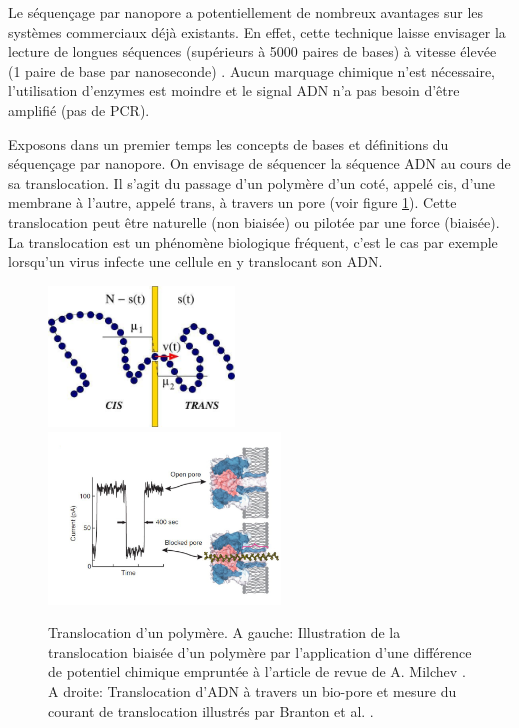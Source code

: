 Le séquençage par nanopore a potentiellement de nombreux avantages sur les systèmes commerciaux déjà existants. En effet, cette technique laisse envisager la lecture de longues séquences (supérieurs à 5000 paires de bases) à vitesse élevée (1 paire de base par nanoseconde) \cite{Timp2010,Branton2008}. Aucun marquage chimique n'est nécessaire, l'utilisation d'enzymes est moindre et le signal ADN n'a pas besoin d'être amplifié (pas de PCR).

Exposons dans un premier temps les concepts de bases et définitions du séquençage par nanopore. On envisage de séquencer la séquence ADN au cours de sa translocation. Il s'agit du passage d'un polymère d'un coté, appelé cis, d'une membrane à l'autre, appelé trans, à travers un pore (voir figure \ref{translocbase}). Cette translocation peut être naturelle (non biaisée) ou pilotée par une force (biaisée). La translocation est un phénomène biologique fréquent, c'est le cas par exemple lorsqu'un virus infecte une cellule en y translocant son ADN.

\begin{figure}[H]
\begin{center}
\includegraphics[width=0.44\textwidth]{translocation.jpg} \includegraphics[width=0.55\textwidth]{translocissues.jpg}

\caption[Translocation et courant de blocage]{Translocation d'un polymère. A gauche: Illustration de la translocation biaisée d'un polymère par l'application d'une différence de potentiel chimique empruntée à l'article de revue de A. Milchev \cite{Milchev2011}. A droite: Translocation d'ADN à travers un bio-pore et mesure du courant de translocation illustrés par Branton et al. \cite{Branton2008}.}
\label{translocbase}
\end{center}
\end{figure}

